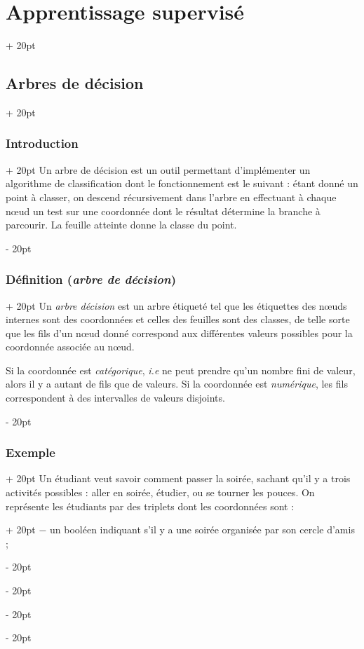 \documentclass[a4paper, 12pt, twoside]{article}
\newcommand{\ind}[1][20pt]{\advance\leftskip + #1}
\newcommand{\deind}[1][20pt]{\advance\leftskip - #1}
\newenvironment{indt}[2][20pt]{#2 \par \ind[#1]}{\par \deind} %
\begin{document}
\begin{indt}{\section{Apprentissage supervisé}}
        \begin{indt}{\subsection{Arbres de décision}}
            \begin{indt}{\subsubsection{Introduction}}
                Un arbre de décision est un outil permettant d'implémenter un algorithme de classification dont le fonctionnement est le suivant :
                étant donné un point à classer, on descend récursivement dans l'arbre en effectuant à chaque n\oe ud un test sur une coordonnée dont le résultat détermine la branche à parcourir.
                La feuille atteinte donne la classe du point.
            \end{indt}

            \vspace{12pt}
            
            \begin{indt}{\subsubsection{Définition (\textit{arbre de décision})}}
                Un \emph{arbre décision} est un arbre étiqueté tel que les étiquettes des n\oe uds internes sont des coordonnées et celles des feuilles sont des classes, de telle sorte que les fils d'un n\oe ud donné correspond aux différentes valeurs possibles pour la coordonnée associée au n\oe ud.

                Si la coordonnée est \emph{catégorique}, \textit{i.e} ne peut prendre qu'un nombre fini de valeur, alors il y a autant de fils que de valeurs.
                Si la coordonnée est \emph{numérique}, les fils correspondent à des intervalles de valeurs disjoints.
            \end{indt}

            \vspace{12pt}
            
            \begin{indt}{\subsubsection{Exemple}}
                Un étudiant veut savoir comment passer la soirée, sachant qu'il y a trois activités possibles : aller en soirée, étudier, ou se tourner les pouces.
                \begin{indt}{On représente les étudiants par des triplets dont les coordonnées sont :}
                    $-$ un booléen indiquant s'il y a une soirée organisée par son cercle d'amis ;


\end{indt}
\end{indt}
\end{indt}
\end{indt}
\end{document}
